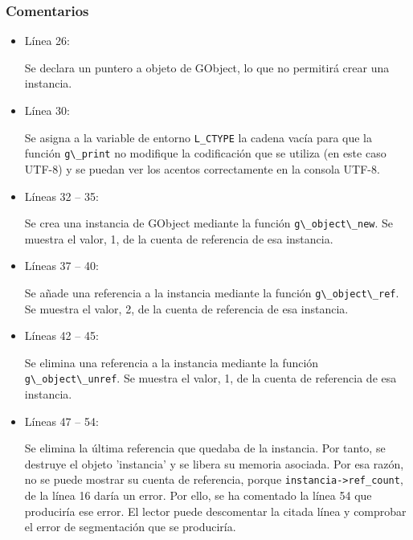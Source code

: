 \subsubsection{Comentarios}
\begin{itemize}
\item Línea 26:\par
  Se declara un puntero a objeto de \textsf{GObject}, lo que no permitirá crear una instancia.
\item Línea 30:\par
  Se asigna a la variable de entorno \texttt{L\_CTYPE} la cadena vacía para que la función
  \passthrough{\lstinline!g\_print!} no modifique la codificación que se utiliza (en este caso UTF-8)
  y se puedan ver los acentos correctamente en la consola UTF-8.
\item Líneas 32 -- 35:\par
  Se crea una instancia de \textsf{GObject} mediante la función \passthrough{\lstinline!g\_object\_new!}.
  Se muestra el valor, 1,  de la cuenta de referencia de esa instancia.
\item Líneas 37 -- 40:\par
  Se añade una referencia a la instancia mediante la función  \passthrough{\lstinline!g\_object\_ref!}.
  Se muestra el valor, 2,  de la cuenta de referencia de esa instancia.
\item Líneas 42 -- 45:\par
  Se elimina una referencia a la instancia mediante la función  \passthrough{\lstinline!g\_object\_unref!}.
  Se muestra el valor, 1,  de la cuenta de referencia de esa instancia.
\item Líneas 47 -- 54:\par
  Se elimina la  última referencia que quedaba de la instancia.
  Por tanto, se destruye el objeto 'instancia' y se libera su memoria asociada.
  Por esa razón, no se puede mostrar su cuenta de referencia, porque
  \passthrough{\lstinline!instancia->ref_count!}, de la línea 16 daría un error.
  Por ello, se ha comentado la línea 54 que produciría ese error.
  El lector puede descomentar la citada línea y comprobar el error de segmentación que se produciría.
  \end{itemize}












